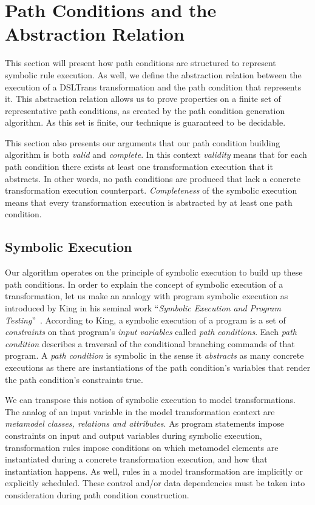 \section{Path Conditions and the Abstraction Relation}
\label{sec:abstraction_relation}


This section will present how path conditions are structured to represent symbolic rule execution. As well, we define the abstraction relation between the execution of a DSLTrans transformation and the path condition that represents it.
This abstraction relation allows us to prove properties on a finite set of representative path conditions, as created by the path condition generation algorithm. As this set is finite, our technique is guaranteed to be decidable.

This section also presents our arguments that our path condition building
algorithm is both \emph{valid} and \emph{complete}. In this context
\emph{validity} means that for each path condition there exists at least one
transformation execution that it abstracts.
In other words, no path conditions are produced that lack a concrete
transformation execution counterpart. \emph{Completeness} of the symbolic
execution means that every transformation execution is abstracted by at least
one path condition.



\subsection{Symbolic Execution}

Our algorithm operates on the principle of symbolic execution to build up these
path conditions. In order to explain the concept of symbolic execution of a
transformation, let us make an analogy with program symbolic execution as
introduced by King in his seminal work ``\emph{Symbolic Execution and Program
Testing}''~\cite{DBLP:journals/cacm/King76}. According to King, a symbolic
execution of a program is a set of \emph{constraints} on that program's
\emph{input variables} called \emph{path conditions}. Each \emph{path condition}
describes a traversal of the conditional branching commands of that program. A
\emph{path condition} is symbolic in the sense it \emph{abstracts} as many
concrete executions as there are instantiations of the path condition's
variables that render the path condition's constraints true.

We can transpose this notion of symbolic execution to model transformations. The
analog of an input variable in the model transformation context are
\emph{metamodel classes, relations and attributes}. As program statements impose
constraints on input and output variables during symbolic execution,
transformation rules impose conditions on which metamodel elements are
instantiated during a concrete transformation execution, and how that
instantiation happens. As well, rules in a model transformation are implicitly
or explicitly scheduled. These control and/or data dependencies must be
taken into consideration during path condition construction.

